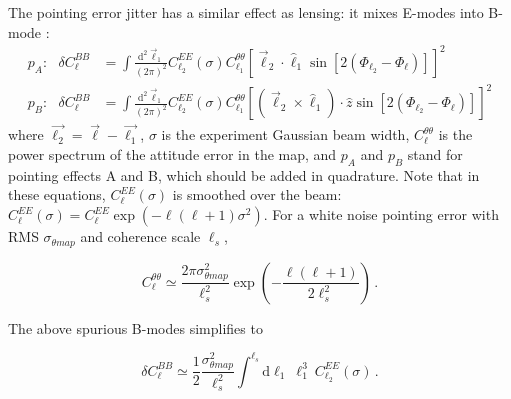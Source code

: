 The pointing error jitter has a similar effect as lensing: it mixes E-modes into B-mode \cite{hu03}:
\begin{align} 
\label{eq: bmodes from attitude errors pa}
p_A: \,\,\,\, \delta C_{\ell}^{BB} &= \int \frac{\mathrm{d^2} \vec{{\ell}}_1}{(2\pi)^2}   C^{EE}_{{\ell}_2}(\sigma) C^{\theta \theta}_{{\ell}_1} [\vec{{\ell}}_2 \cdot              \hat{{\ell}}_1 \sin[2(\Phi_{{\ell}_2} - \Phi_{\ell})]]^2 \\
\label{eq: bmodes from attitude errors pb}
p_B: \,\,\,\, \delta C_{\ell}^{BB} &= \int \frac{\mathrm{d^2} \vec{{\ell}}_1}{(2\pi)^2}   C^{EE}_{{\ell}_2}(\sigma) C^{\theta \theta}_{{\ell}_1} [(\vec{{\ell}}_2 \times            \hat{{\ell}}_1) \cdot \hat{z} \sin[2(\Phi_{{\ell}_2} - \Phi_{\ell})]]^2 
\end{align}
\noindent where  $\vec{{\ell}_2} = \vec{{\ell}} - \vec{{\ell}_1}$, $\sigma$ is the experiment Gaussian beam width, $C_{\ell}^{\theta \theta}$ is the power spectrum of the attitude error in the map, and $p_A$ and $p_B$ stand for pointing effects A and B, which should be added in quadrature.
Note that in these equations, $C_{\ell}^{EE}(\sigma)$ is smoothed over the beam:  $C^{EE}_{\ell}(\sigma) = C^{EE}_{\ell} \exp{(-{\ell}({\ell}+1)\sigma^2)}$.
For a white noise pointing error with RMS $\sigma_{\theta map}$ and coherence scale $\ell_s$,

\begin{equation}
 C^{\theta \theta}_{\ell} \simeq \frac{2\pi\sigma_{\theta map}^2}{{\ell}_s^2}\exp(-\frac{{\ell}({\ell}+1)}{2{\ell}_s^2}) \, .
\end{equation}

\noindent The above spurious B-modes simplifies to

\begin{equation}
\delta  C_{\ell}^{BB} \simeq  \frac{1}{2}\frac{\sigma_{\theta map}^2}{{\ell}_s^2}         \int^{{\ell}_s} \mathrm{d}{\ell}_1 \ {\ell}_1^3 \ C^{EE}_{{\ell}_2}(\sigma) \, .
\end{equation}


